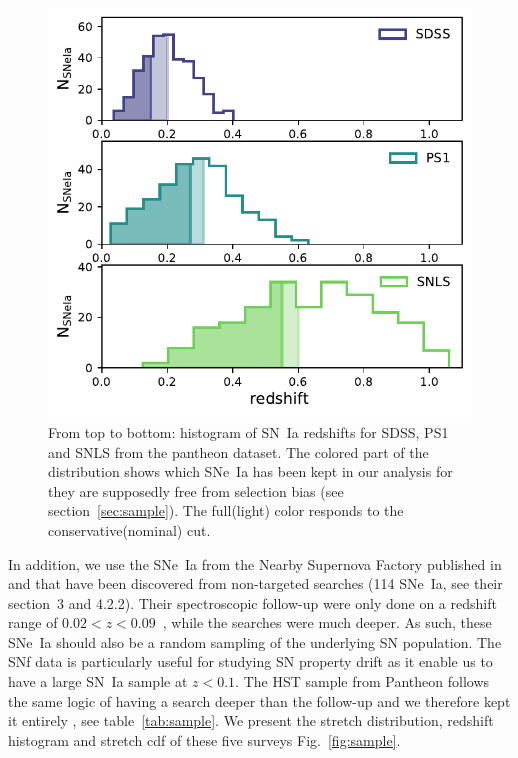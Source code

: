 \documentclass[]{aa} %
\newcommand{\nn}[1]{{\textcolor[rgb]{1, 0.27, 0}{#1}}}
\begin{document}
\begin{figure}
    \centering
    \includegraphics[width=0.95\linewidth]{Article_figures/hist_surveys_cuts_55.pdf}
    \caption{From top to bottom: histogram of SN~Ia redshifts for SDSS, PS1 and
    SNLS from the pantheon dataset. The colored part of the
distribution shows which SNe~Ia has been kept in our analysis for they are
supposedly free from selection bias (see section~\ref{sec:sample}). The
full(light) color responds to the conservative(nominal) cut.}
    \label{fig:cuts}
\end{figure}

In addition, we use the SNe~Ia from the Nearby Supernova Factory
\citep[SNfactory][]{aldering2004} published in \cite{rigault2018} and that have
been discovered from non-targeted searches (114 SNe~Ia, see their section~3 and
4.2.2). \nn{Their spectroscopic follow-up were only done on a redshift range of
$0.02<z<0.09$~\citep[as in ][]{rigault2018}, while the searches were much
deeper. As such, these SNe~Ia} should also be a random sampling of the underlying
SN population. The SNf data is particularly useful for studying SN property
drift as it enable us to have a large SN~Ia sample at $z<0.1$.  The HST sample
from Pantheon follows the same logic of having a search deeper than the
follow-up and we therefore kept it entirely \citep{strolger04}, see
table~\ref{tab:sample}. \nn{We present the stretch distribution, redshift histogram
and stretch cdf of these five surveys Fig.~\ref{fig:sample}}.
\end{document}

